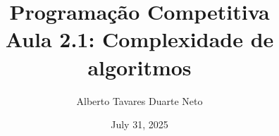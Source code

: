 \documentclass{beamer}
\title{{\Large Programação Competitiva}\\ Aula 2.1: Complexidade de algoritmos}
\date{July 31, 2025}
\author{Alberto Tavares Duarte Neto}
\institute{Universidade de Brasília}
\numberwithin{equation}{subsection}
\begin{document}
    \maketitle
    \small

    
    
\end{document}
